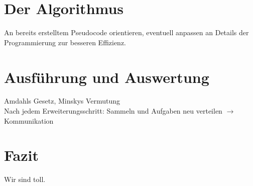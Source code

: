 \documentclass[a4paper]{scrartcl}
\begin{document}
\section{Der Algorithmus}

An bereits erstelltem Pseudocode orientieren, eventuell anpassen an Details der Programmierung zur besseren Effizienz.



\section{Ausführung und Auswertung}
Amdahls Gesetz, Minskys Vermutung\\
Nach jedem Erweiterungsschritt: Sammeln und Aufgaben neu verteilen $\rightarrow$ Kommunikation

\section{Fazit}
Wir sind toll.

\newpage
\printbibliography[heading=bibintoc]
\end{document}
